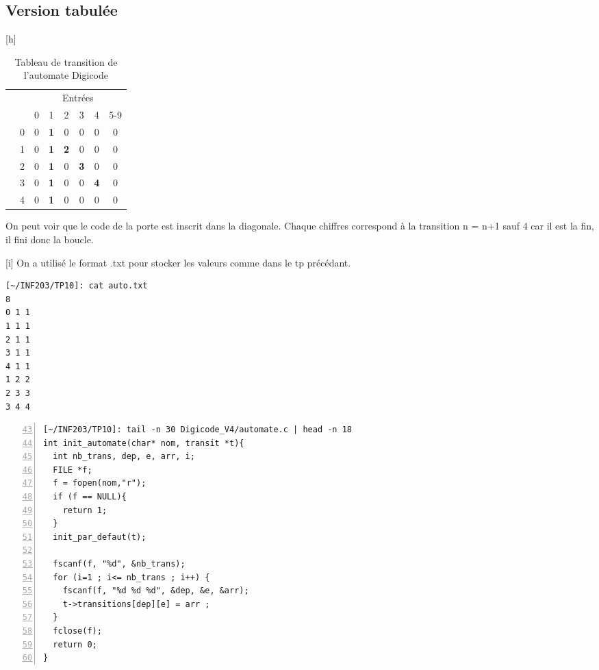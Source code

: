 \documentclass[12pt,a4paper,notitlepage,colorinlistoftodos]{article}
\begin{document}
\subsection{Version tabulée}

[h]
\begin{table}[!ht]
  \centering
  \begin{tabular}{cccccccc}
  & &\multicolumn{6}{c}{Entrées} \\
    & & 0 & 1 & 2 & 3 & 4 & 5-9 \\ %
  \cmidrule{3-8}
  \parbox[t]{5pt}{} 
  & 0 & 0 & \textbf{1} & 0 & 0 & 0 & 0 \\ 
  & 1 & 0 & \textbf{1} & \textbf{2} & 0 & 0 & 0 \\
  & 2 & 0 & \textbf{1} & 0 & \textbf{3} & 0 & 0 \\
  & 3 & 0 & \textbf{1} & 0 & 0 & \textbf{4} & 0 \\ 
  & 4 & 0 & \textbf{1} & 0 & 0 & 0 & 0 \\ 
  \bottomrule
  \end{tabular}
  \caption{Tableau de transition de l'automate Digicode}
  \label{tab:my_label}
\end{table}

On peut voir que le code de la porte est inscrit dans la diagonale.
Chaque chiffres correspond à la transition n = n+1 sauf 4 car il est la fin, il fini donc la boucle.


[i]
On a utilisé le format .txt pour stocker les valeurs comme dans le tp précédant.

\begin{lstlisting}
[~/INF203/TP10]: cat auto.txt 
8
0 1 1
1 1 1
2 1 1
3 1 1
4 1 1
1 2 2
2 3 3
3 4 4
\end{lstlisting}

\begin{lstlisting}[numbers=left, firstnumber = 43]
[~/INF203/TP10]: tail -n 30 Digicode_V4/automate.c | head -n 18
int init_automate(char* nom, transit *t){
  int nb_trans, dep, e, arr, i;
  FILE *f;
  f = fopen(nom,"r");
  if (f == NULL){
    return 1;
  }
  init_par_defaut(t);

  fscanf(f, "%d", &nb_trans);
  for (i=1 ; i<= nb_trans ; i++) {
    fscanf(f, "%d %d %d", &dep, &e, &arr);
    t->transitions[dep][e] = arr ;
  }
  fclose(f);
  return 0;
}
\end{lstlisting}

\cite{}


\end{document}
